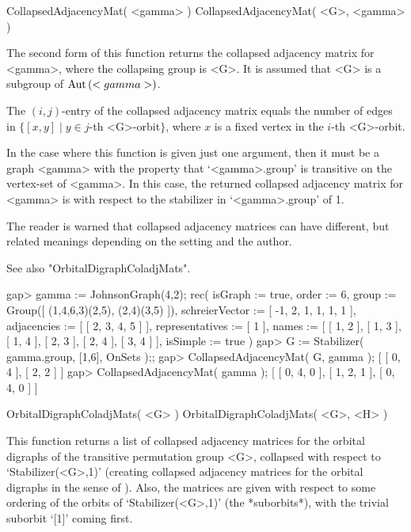 
\>CollapsedAdjacencyMat( <gamma> )
\>CollapsedAdjacencyMat( <G>, <gamma> )

The second form of this function returns  the  collapsed adjacency
matrix for <gamma>, where the  collapsing group  is <G>.  It is
assumed that <G> is a subgroup of ${\rm Aut}\,(<gamma>)$.

The $(i,j)$-entry of the collapsed adjacency matrix  equals the number of
edges in   $\{ [x,y]\mid  y \in j$-th <G>-orbit$\}$, where  $x$ is  a fixed
vertex in the $i$-th <G>-orbit.

In the case where this function is given just one argument, then it must
be a graph <gamma> with the property that `<gamma>.group' is transitive on
the vertex-set of <gamma>.  In this case, the returned collapsed adjacency
matrix for <gamma> is with respect to the stabilizer in `<gamma>.group'
of 1.

The reader is warned that collapsed adjacency matrices can have different,
but related meanings depending on the setting and the author.

See also "OrbitalDigraphColadjMats".

\beginexample
gap> gamma := JohnsonGraph(4,2);
rec( isGraph := true, order := 6,
  group := Group([ (1,4,6,3)(2,5), (2,4)(3,5) ]),
  schreierVector := [ -1, 2, 1, 1, 1, 1 ], adjacencies := [ [ 2, 3, 4, 5 ] ],
  representatives := [ 1 ],
  names := [ [ 1, 2 ], [ 1, 3 ], [ 1, 4 ], [ 2, 3 ], [ 2, 4 ], [ 3, 4 ] ],
  isSimple := true )
gap> G := Stabilizer( gamma.group, [1,6], OnSets );;
gap> CollapsedAdjacencyMat( G, gamma );
[ [ 0, 4 ], [ 2, 2 ] ]
gap> CollapsedAdjacencyMat( gamma );
[ [ 0, 4, 0 ], [ 1, 2, 1 ], [ 0, 4, 0 ] ]
\endexample


\>OrbitalDigraphColadjMats( <G> )
\>OrbitalDigraphColadjMats( <G>, <H> )

This function returns a list of collapsed adjacency matrices for the
orbital digraphs of the transitive permutation group <G>, collapsed
with respect to `Stabilizer(<G>,1)' (creating collapsed adjacency
matrices for the orbital digraphs in the sense of \cite{PS97}). Also,
the matrices are given with respect to some ordering of the
orbits of `Stabilizer(<G>,1)' (the *suborbits*), with the trivial 
suborbit `[1]' coming first.

